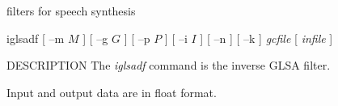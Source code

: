 % 
% 
% 
% 
%                                                                        
%
%
{filters for speech synthesis}

\begin{synopsis}
\item [iglsadf] [ --m $M$ ] [ --g $G$ ] [ --p $P$ ] [ --i $I$ ]
	  	[ --n ] [ --k ] {\em gcfile}  [ {\em infile} ] 
\end{synopsis}

\begin{qsection}{DESCRIPTION}
The {\em iglsadf} command is the inverse GLSA filter.
\par
Input and output data are in float format.

\end{qsection}

